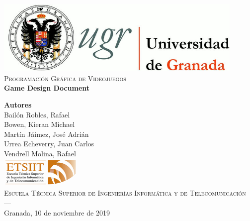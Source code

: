 \documentclass{article}
\begin{document}

\begin{titlepage}
  
\newlength{\centeroffset}
\setlength{\centeroffset}{-0.5\oddsidemargin}
\addtolength{\centeroffset}{0.5\evensidemargin}
\thispagestyle{empty}
\noindent\hspace*{\centeroffset}

\begin{minipage}{\textwidth}

\centering

\includegraphics[width=0.9\textwidth]{figures/UGR.jpg}\\[2cm]

\textsc{\Large Programación Gráfica de Videojuegos\\[0.5cm]}
\Huge\bfseries Game Design Document\\

\end{minipage}

\vspace{2.5cm}
\noindent\hspace*{\centeroffset}\begin{minipage}{\textwidth}
\centering
\textbf{Autores}\\ [0.25cm] {Bailón Robles, Rafael}\\{Bowen, Kieran Michael}\\{Martín Jáimez, José Adrián}\\{Urrea Echeverry, Juan Carlos}\\{Vendrell Molina, Rafael}\\[3cm]

\includegraphics[width=0.3\textwidth]{figures/ETSIIT.png}\\[0.5cm]

\textsc{Escuela Técnica Superior de Ingenierías Informática y de Telecomunicación}\\
\textsc{---}\\Granada, 10 de noviembre de 2019

\end{minipage}

\end{titlepage}
\end{document}
